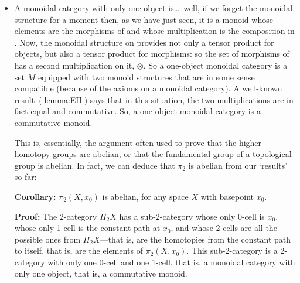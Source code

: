 \begin{itemize}
\item A monoidal category%
%
%
 with only one object is\ldots\ well, if
we forget the monoidal structure for a moment then, as we have just seen,
it is a monoid whose elements are the morphisms of  and whose
multiplication is the composition in .  Now, the monoidal structure
on  provides not only a tensor product for objects, but also a
tensor product for morphisms: so the set of morphisms of  has a
second multiplication on it, $\otimes$.  So a one-object monoidal category
is a set $M$ equipped with two monoid structures that are in some sense
compatible (because of the axioms on a monoidal category).  A well-known
result~(\ref{lemma:EH})%
%
%
says that in this situation, the two
multiplications are in fact equal and commutative.  So, a one-object
monoidal category is a commutative monoid.

This is, essentially, the argument often used to prove that the higher
homotopy groups are abelian, or that the fundamental group of a topological
group is abelian.  In fact, we can deduce that $\pi_2$%
%
%
is abelian from our
`results' so far:

\textbf{Corollary:} $\pi_2(X,x_0)$ is abelian, for any space $X$ with
basepoint $x_0$. 

\textbf{Proof:} The 2-category $\Pi_2 X$%
%
%
has a sub-2-category whose only
0-cell is $x_0$, whose only 1-cell is the constant path at $x_0$, and whose
2-cells are all the possible ones from $\Pi_2 X$---that is, are the
homotopies from the constant path to itself, that is, are the elements of
$\pi_2(X,x_0)$.  This sub-2-category is a 2-category with only one 0-cell
and one 1-cell, that is, a monoidal category with only one object, that is,
a commutative monoid.


\end{itemize}
